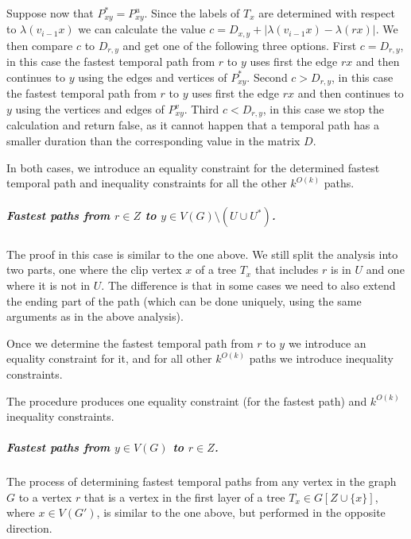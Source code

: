 \documentclass[a4paper,UKenglish,cleveref, autoref, thm-restate]{lipics-v2021}
\begin{document}
\begin{enumerate}[(i)]
    Suppose now that $P_{xy}^* = P_{xy}^u$.
    Since the labels of $T_x$ are determined with respect to $\lambda(v_{i-1} x)$ we can calculate the value $c = D_{x,y} + |\lambda(v_{i-1} x) - \lambda (r x)|$.
    We then compare $c$ to $D_{r,y}$ and get one of the following three options.
    First $c = D_{r,y}$, in this case the fastest temporal path from $r$ to $y$ uses first the edge $rx$ and then continues to $y$ using the edges and vertices of $P_{xy}^*$.
    Second $c > D_{r,y}$, in this case the fastest temporal path from $r$ to $y$ uses first the edge $rx$ and then continues to $y$ using the vertices and edges of $P_{xy}^v$.
    Third $c < D_{r,y}$, in this case we stop the calculation and return false, as it cannot happen that a temporal path has a smaller duration than the corresponding value in the matrix $D$.
%
\end{enumerate}
In both cases, we introduce an equality constraint for the determined fastest temporal path and inequality constraints for all the other $k^{O(k)}$ paths.

\subparagraph{\boldmath Fastest paths from $r \in Z$ to $y \in V(G) \setminus (U \cup U^*)$.}
The proof in this case is similar to the one above.  We still split the analysis into two parts, one where the clip vertex $x$ of a tree $T_x$ that includes $r$ is in $U$ and one where it is not in $U$.
The difference is that in some cases we need to also extend the ending part of the path (which can be done uniquely, using the same arguments as in the above analysis).

Once we determine the fastest temporal path from $r$ to $y$ we introduce an equality constraint for it, and for all other $k^{O(k)}$ paths we introduce inequality constraints.

The procedure produces one equality constraint (for the fastest path) and $k^{O(k)}$ inequality constraints.

\subparagraph{\boldmath Fastest paths from $y \in V(G)$ to $r \in Z$.}
The process of determining fastest temporal paths from any vertex in the graph $G$ to a vertex $r$ that is a vertex in the first layer of a tree $T_x \in G[Z \cup \{x\}]$, where $x \in V(G')$,
is similar to the one above, but performed in the opposite direction.
\end{document}

